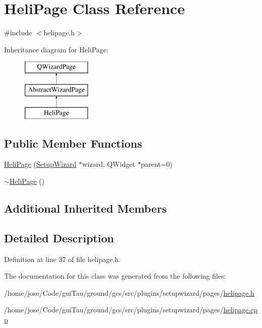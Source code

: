 \hypertarget{class_heli_page}{\section{Heli\-Page Class Reference}
\label{class_heli_page}
}


{\ttfamily \#include $<$helipage.\-h$>$}

Inheritance diagram for Heli\-Page\-:\begin{figure}[H]
\begin{center}
\leavevmode
\includegraphics[height=3.000000cm]{class_heli_page}
\end{center}
\end{figure}
\subsection*{Public Member Functions}
\begin{DoxyCompactItemize}
\item 
\hyperlink{group___heli_page_ga894cc849703e9f7ead7dc27b2107c325}{Heli\-Page} (\hyperlink{class_setup_wizard}{Setup\-Wizard} $\ast$wizard, Q\-Widget $\ast$parent=0)
\item 
\hyperlink{group___heli_page_ga63708ecb9592a865a1927e399656a3f9}{$\sim$\-Heli\-Page} ()
\end{DoxyCompactItemize}
\subsection*{Additional Inherited Members}


\subsection{Detailed Description}


Definition at line 37 of file helipage.\-h.



The documentation for this class was generated from the following files\-:\begin{DoxyCompactItemize}
\item 
/home/jose/\-Code/gui\-Tau/ground/gcs/src/plugins/setupwizard/pages/\hyperlink{helipage_8h}{helipage.\-h}\item 
/home/jose/\-Code/gui\-Tau/ground/gcs/src/plugins/setupwizard/pages/\hyperlink{helipage_8cpp}{helipage.\-cpp}\end{DoxyCompactItemize}
